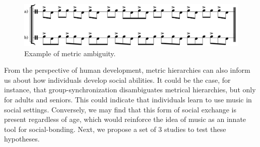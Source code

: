 \documentclass[16pt]{article}
\begin{document}
\begin{figure}
\centering
\includegraphics[scale=0.8]{ambiguous.png}
\caption{Example of metric ambiguity.}
\label{fig:fig1}
\end{figure}



From the perspective of human development, metric hierarchies can also inform us about how individuals develop social abilities. It could be the case, for instance, that group-synchronization disambiguates metrical hierarchies, but only for adults and seniors. This could indicate that individuals learn to use music in social settings. Conversely, we may find that this form of social exchange is present regardless of age, which would reinforce the idea of music as an innate tool for social-bonding. Next, we propose a set of 3 studies to test these hypotheses.

\end{document}
